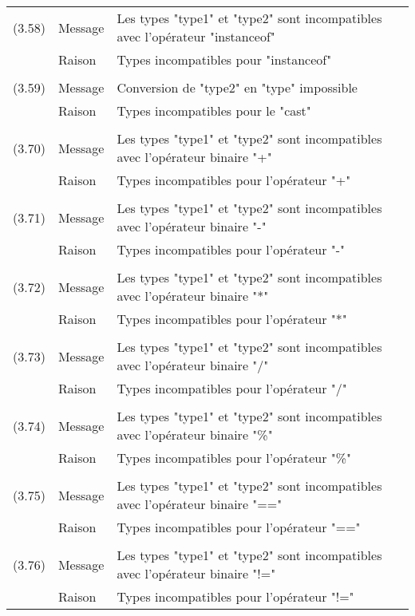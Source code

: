 \documentclass[11pt]{article}
\begin{document}
      \begin{tabular}{lll}
      (3.58) & Message & Les types "type1" et "type2" sont incompatibles avec l'opérateur "instanceof"\\
      & Raison & Types incompatibles pour "instanceof"\\
      \\
      (3.59) & Message & Conversion de "type2" en "type" impossible\\
      & Raison & Types incompatibles pour le "cast"\\
      \\
      (3.70) & Message & Les types "type1" et "type2" sont incompatibles avec l'opérateur binaire "+"\\
      & Raison & Types incompatibles pour l'opérateur "+"\\
      \\
      (3.71) & Message & Les types "type1" et "type2" sont incompatibles avec l'opérateur binaire "-"\\
      & Raison & Types incompatibles pour l'opérateur "-"\\
      \\
      (3.72) & Message & Les types "type1" et "type2" sont incompatibles avec l'opérateur binaire "*"\\
      & Raison & Types incompatibles pour l'opérateur "*"\\
      \\
      (3.73) & Message & Les types "type1" et "type2" sont incompatibles avec l'opérateur binaire "/"\\
      & Raison & Types incompatibles pour l'opérateur "/"\\
      \\
      (3.74) & Message & Les types "type1" et "type2" sont incompatibles avec l'opérateur binaire "\%"\\
      & Raison & Types incompatibles pour l'opérateur "\%"\\
      \\
      (3.75) & Message & Les types "type1" et "type2" sont incompatibles avec l'opérateur binaire "=="\\
      & Raison & Types incompatibles pour l'opérateur "=="\\
      \\
      (3.76) & Message & Les types "type1" et "type2" sont incompatibles avec l'opérateur binaire "!="\\
      & Raison & Types incompatibles pour l'opérateur "!="\\

\end{tabular}
\end{document}
